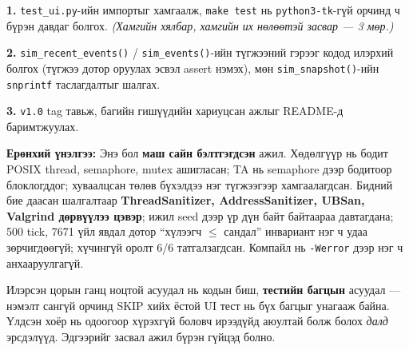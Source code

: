 \documentclass[11pt,a4paper]{article}
\begin{document}
\textbf{1.} \texttt{test\_ui.py}-ийн импортыг хамгаалж, \texttt{make test}
нь \texttt{python3-tk}-гүй орчинд ч бүрэн давдаг болгох. \emph{(Хамгийн
хялбар, хамгийн их нөлөөтэй засвар --- 3 мөр.)}

\vspace{3mm}\textbf{2.} \texttt{sim\_recent\_events()} /
\texttt{sim\_events()}-ийн түгжээний гэрээг кодод илэрхий болгох (түгжээ
дотор оруулах эсвэл assert нэмэх), мөн \texttt{sim\_snapshot()}-ийн
\texttt{snprintf} таслагдалтыг шалгах.

\vspace{3mm}\textbf{3.} \texttt{v1.0} tag тавьж, багийн гишүүдийн хариуцсан
ажлыг README-д баримтжуулах.

\vspace{6mm}
\noindent\textbf{Ерөнхий үнэлгээ:}
Энэ бол \textbf{маш сайн бэлтгэгдсэн} ажил. Хөдөлгүүр нь бодит POSIX thread,
semaphore, mutex ашигласан; TA нь semaphore дээр бодитоор блоклогддог;
хуваалцсан төлөв бүхэлдээ нэг түгжээгээр хамгаалагдсан. Бидний бие даасан
шалгалтаар \textbf{ThreadSanitizer, AddressSanitizer, UBSan, Valgrind
дөрвүүлээ цэвэр}; ижил seed дээр үр дүн байт байтаараа давтагдана;
500 tick, 7671 үйл явдал дотор ``хүлээгч $\le$ сандал'' инвариант
нэг ч удаа зөрчигдөөгүй; хүчингүй оролт 6/6 татгалзагдсан. Компайл нь
\texttt{-Werror} дээр нэг ч анхааруулгагүй.

Илэрсэн цорын ганц ноцтой асуудал нь кодын биш, \textbf{тестийн багцын}
асуудал --- нэмэлт сангүй орчинд SKIP хийх ёстой UI тест нь бүх багцыг
унагааж байна. Үлдсэн хоёр нь одоогоор хүрэхгүй боловч ирээдүйд аюултай
болж болох \emph{далд} эрсдэлүүд. Эдгээрийг засвал ажил бүрэн гүйцэд болно.
\end{document}
